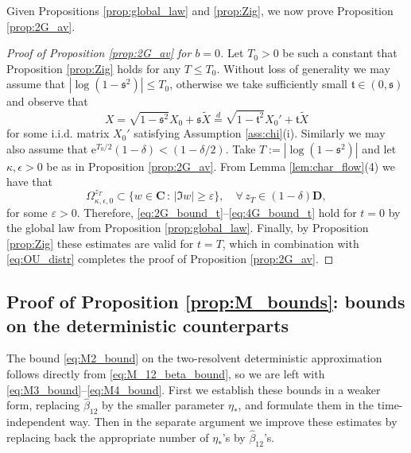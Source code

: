 \documentclass[10pt]{amsart}
\numberwithin{equation}{section}
\newcommand{\C}{\mathbf{C}}
\newcommand{\ee}{\mathrm{e}}
\begin{document}
Given Propositions \ref{prop:global_law} and \ref{prop:Zig}, we now prove Proposition \ref{prop:2G_av}.


\begin{proof}[Proof of Proposition \ref{prop:2G_av} for $b=0$] Let $T_0>0$ be such a constant that Proposition \ref{prop:Zig} holds for any $T\le T_0$. Without loss of generality we may assume that $|\log(1-\mathfrak{s}^2)|\le T_0$, otherwise we take sufficiently small $\mathfrak{t}\in(0,\mathfrak{s})$ and observe that 
\begin{equation}
X=\sqrt{1-\mathfrak{s}^2}X_0+\mathfrak{s}\widetilde{X}\stackrel{d}{=}\sqrt{1-\mathfrak{t}^2}X_0'+\mathfrak{t}\widetilde{X}
\label{eq:smaller_G_comp}
\end{equation}
for some i.i.d. matrix $X_0'$ satisfying Assumption \ref{ass:chi}(i). Similarly we may also assume that $\ee^{T_0/2}(1-\delta)<(1-\delta/2)$. Take $T:=|\log(1-\mathfrak{s}^2)|$ and let $\kappa, \epsilon>0$ be as in Proposition \ref{prop:2G_av}. From Lemma \ref{lem:char_flow}(4) we have that 
\begin{equation}
\Omega^{z_T}_{\kappa,\epsilon,0}\subset \{w\in\C\,:\, |\Im w|\ge \varepsilon\},\quad \forall \, z_T\in (1-\delta)\mathbf{D},
\label{eq:domain_inclusion}
\end{equation}
for some $\varepsilon>0$. Therefore, \eqref{eq:2G_bound_t}--\eqref{eq:4G_bound_t} hold for $t=0$ by the global law from Proposition \ref{prop:global_law}. Finally, by Proposition \ref{prop:Zig} these estimates are valid for $t=T$, which in combination with \eqref{eq:OU_distr} completes the proof of Proposition \ref{prop:2G_av}.
\end{proof}




\subsection{Proof of Proposition \ref{prop:M_bounds}: bounds on the deterministic counterparts}\label{sec:M_bounds}


The bound \eqref{eq:M2_bound} on the two-resolvent deterministic approximation follows directly from \eqref{eq:M_12_beta_bound}, so we are left with \eqref{eq:M3_bound}--\eqref{eq:M4_bound}. First we establish these bounds in a weaker form, replacing $\widehat{\beta}_{12}$ by the smaller parameter $\eta_*$, and formulate them in the time-independent way. Then in the separate argument we improve these estimates by replacing back the appropriate number of $\eta_*$'s by $\widehat{\beta}_{12}$'s.
\end{document}
